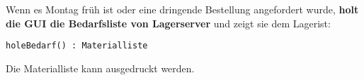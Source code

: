 Wenn es Montag früh ist oder eine dringende Bestellung angefordert wurde, \textbf{holt die GUI die Bedarfsliste von Lagerserver} und zeigt sie dem Lagerist:

\texttt{holeBedarf() : Materialliste}

Die Materialliste kann ausgedruckt werden.
